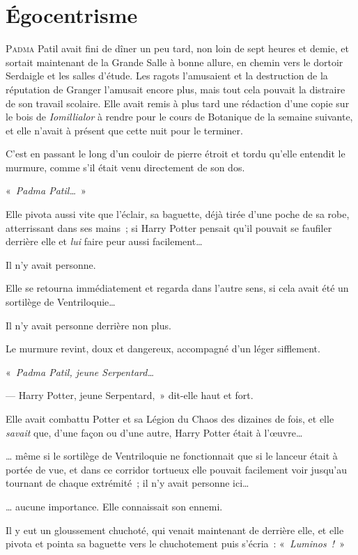 \chapter{Égocentrisme}

\lettrine{P}{adma} Patil avait fini de dîner un peu tard, non loin de sept heures et demie, et sortait maintenant de la Grande Salle à bonne allure, en chemin vers le dortoir Serdaigle et les salles d'étude.
Les ragots l'amusaient et la destruction de la réputation de Granger l'amusait encore plus, mais tout cela pouvait la distraire de son travail scolaire.
Elle avait remis à plus tard une rédaction d'une copie sur le bois de \emph{Iomillialor} à rendre pour le cours de Botanique de la semaine suivante, et elle n'avait à présent que cette nuit pour le terminer.

C'est en passant le long d'un couloir de pierre étroit et tordu qu'elle entendit le murmure, comme s'il était venu directement de son dos.

«~\emph{Padma Patil…}~»

Elle pivota aussi vite que l'éclair, sa baguette, déjà tirée d'une poche de sa robe, atterrissant dans ses mains~; si Harry Potter pensait qu'il pouvait se faufiler derrière elle et \emph{lui} faire peur aussi facilement…

Il n'y avait personne.

Elle se retourna immédiatement et regarda dans l'autre sens, si cela avait été un sortilège de Ventriloquie…

Il n'y avait personne derrière non plus.

Le murmure revint, doux et dangereux, accompagné d'un léger sifflement.

«~\emph{Padma Patil, jeune Serpentard…}

--- Harry Potter, jeune Serpentard,~» dit-elle haut et fort.

Elle avait combattu Potter et sa Légion du Chaos des dizaines de fois, et elle \emph{savait} que, d'une façon ou d'une autre, Harry Potter était à l'œuvre…

… même si le sortilège de Ventriloquie ne fonctionnait que si le lanceur était à portée de vue, et dans ce corridor tortueux elle pouvait facilement voir jusqu'au tournant de chaque extrémité~; il n'y avait personne ici…

… aucune importance.
Elle connaissait son ennemi.

Il y eut un gloussement chuchoté, qui venait maintenant de derrière elle, et elle pivota et pointa sa baguette vers le chuchotement puis s'écria~: «~\emph{Luminos~!}~»

